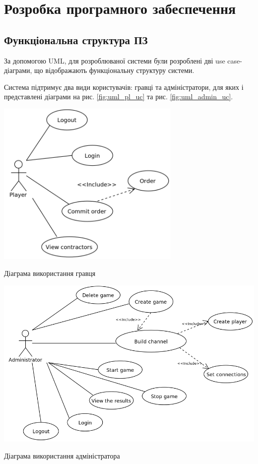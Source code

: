 \section{Розробка програмного забеспечення}
\subsection{Функціональна структура ПЗ}
За допомогою UML, для розроблюваної системи були розроблені дві use case-діаграми, що відображають функціональну структуру системи.

Система підтримує два види користувачів: гравці та адміністратори, для яких і представлені діаграми на рис. \ref{fig:uml_pl_uc} та рис. \ref{fig:uml_admin_uc}.
\begin{stdfigure}
    \includegraphics[width=3.5in]{images/uml/player_use_cases.png}
    \caption{Діаграма використання гравця}
    \label{fig:uml_pl_uc}
\end{stdfigure}   

\begin{stdfigure}
    \includegraphics[width=6in]{images/uml/admin_use_cases.png}
    \caption{Діаграма використання адміністратора}
    \label{fig:uml_admin_uc}
\end{stdfigure}
